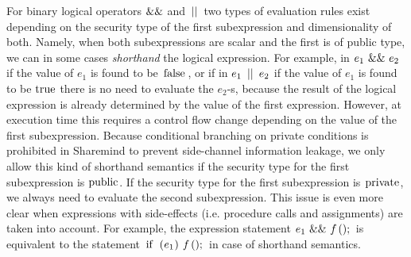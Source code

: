 \documentclass[a4paper, 10pt, draft]{report}
\newcommand{\mycode}[1]{\ensuremath{\mbox{\lstinline{#1}}}}
\begin{document}
For binary logical operators \mycode{&&} and \mycode{||} two types of
evaluation rules exist depending on the security type of the first
subexpression and dimensionality of both. Namely, when both subexpressions are
scalar and the first is of public type, we can in some cases \textit{shorthand}
the logical expression. For example, in $e_1\ \mycode{&&}\ e_2$ if the value of
$e_1$ is found to be \mycode{false}, or if in $e_1\ \mycode{||}\ e_2$ if the
value of $e_1$ is found to be \mycode{true} there is no need to evaluate the
$e_2$-s, because the result of the logical expression is already determined by
the value of the first expression. However, at execution time this requires a
control flow change depending on the value of the first subexpression. Because
conditional branching on private conditions is prohibited in Sharemind to
prevent side-channel information leakage, we only allow this kind of shorthand
semantics if the security type for the first subexpression is \mycode{public}.
If the security type for the first subexpression is \mycode{private}, we always
need to evaluate the second subexpression.  This issue is even more clear when
expressions with side-effects (i.e. procedure calls and assignments) are taken
into account.  For example, the expression statement $e_1\ \mycode{&&}\
f\mycode{();}$ is equivalent to the statement $\mycode{if (}e_1\mycode{)}\
f\mycode{();}$ in case of shorthand semantics.
\end{document}
